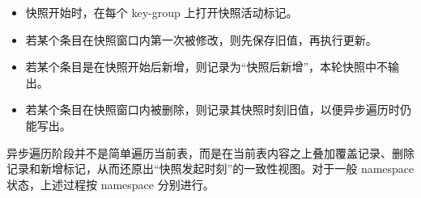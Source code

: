 \documentclass[a4paper,11pt]{article}
\begin{document}
\begin{itemize}
  \item 快照开始时，在每个 key-group 上打开快照活动标记。
  \item 若某个条目在快照窗口内第一次被修改，则先保存旧值，再执行更新。
  \item 若某个条目是在快照开始后新增，则记录为“快照后新增”，本轮快照中不输出。
  \item 若某个条目在快照窗口内被删除，则记录其快照时刻旧值，以便异步遍历时仍能写出。
\end{itemize}

异步遍历阶段并不是简单遍历当前表，而是在当前表内容之上叠加覆盖记录、删除记录和新增标记，从而还原出“快照发起时刻”的一致性视图。对于一般 namespace 状态，上述过程按 namespace 分别进行。

\end{document}

